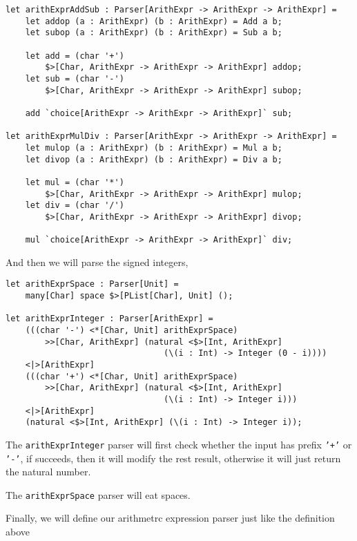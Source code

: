 \begin{lstlisting}
let arithExprAddSub : Parser[ArithExpr -> ArithExpr -> ArithExpr] =
    let addop (a : ArithExpr) (b : ArithExpr) = Add a b;
    let subop (a : ArithExpr) (b : ArithExpr) = Sub a b;

    let add = (char '+')
        $>[Char, ArithExpr -> ArithExpr -> ArithExpr] addop;
    let sub = (char '-')
        $>[Char, ArithExpr -> ArithExpr -> ArithExpr] subop;

    add `choice[ArithExpr -> ArithExpr -> ArithExpr]` sub;

let arithExprMulDiv : Parser[ArithExpr -> ArithExpr -> ArithExpr] =
    let mulop (a : ArithExpr) (b : ArithExpr) = Mul a b;
    let divop (a : ArithExpr) (b : ArithExpr) = Div a b;

    let mul = (char '*')
        $>[Char, ArithExpr -> ArithExpr -> ArithExpr] mulop;
    let div = (char '/')
        $>[Char, ArithExpr -> ArithExpr -> ArithExpr] divop;

    mul `choice[ArithExpr -> ArithExpr -> ArithExpr]` div;
\end{lstlisting}

And then we will parse the signed integers,

\begin{lstlisting}
let arithExprSpace : Parser[Unit] =
    many[Char] space $>[PList[Char], Unit] ();

let arithExprInteger : Parser[ArithExpr] =
    (((char '-') <*[Char, Unit] arithExprSpace)
        >>[Char, ArithExpr] (natural <$>[Int, ArithExpr]
                                (\(i : Int) -> Integer (0 - i))))
    <|>[ArithExpr]
    (((char '+') <*[Char, Unit] arithExprSpace)
        >>[Char, ArithExpr] (natural <$>[Int, ArithExpr]
                                (\(i : Int) -> Integer i)))
    <|>[ArithExpr]
    (natural <$>[Int, ArithExpr] (\(i : Int) -> Integer i));
\end{lstlisting}

The \texttt{arithExprInteger} parser will first check whether the input has prefix \texttt{'+'} or \texttt{'-'}, if succeeds, then it will modify the rest result, otherwise it will just return the natural number.

The \texttt{arithExprSpace} parser will eat spaces.

Finally, we will define our arithmetrc expression parser just like the definition above

